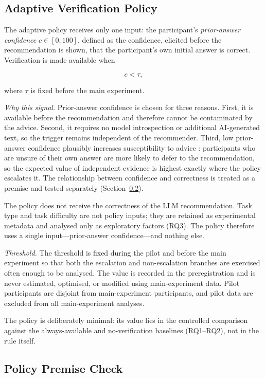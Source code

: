 \documentclass[oneside,final,14pt,a4paper]{extreport}
\begin{document}
\subsection{Adaptive Verification Policy}
\label{subsec:policy}

The adaptive policy receives only one input: the participant's
\emph{prior-answer confidence} $c\in[0,100]$, defined as the confidence,
elicited before the recommendation is shown, that the participant's own
initial answer is correct. Verification is made available when

\[
c < \tau,
\]

where $\tau$ is fixed before the main experiment.

\emph{Why this signal.} Prior-answer confidence is chosen for three reasons.
First, it is available before the recommendation and therefore cannot be
contaminated by the advice. Second, it requires no model introspection or
additional AI-generated text, so the trigger remains independent of the
recommender. Third, low prior-answer confidence plausibly increases
susceptibility to advice \cite{YanivKleinberger2000}: participants who are unsure of their
own answer are more likely to defer to the recommendation, so the expected
value of independent evidence is highest exactly where the policy escalates
it. The relationship between confidence and correctness is treated as a
premise and tested separately (Section~\ref{subsec:premise}).

The policy does not receive the correctness of the LLM recommendation. Task
type and task difficulty are not policy inputs; they are retained as
experimental metadata and analysed only as exploratory factors (RQ3). The
policy therefore uses a single input---prior-answer confidence---and nothing
else.

\emph{Threshold.} The threshold is fixed during the pilot and before the main
experiment so that both the escalation and non-escalation branches are
exercised often enough to be analysed. The value is recorded in the
preregistration and is never estimated, optimised, or modified using
main-experiment data. Pilot participants are disjoint from main-experiment
participants, and pilot data are excluded from all main-experiment analyses.

The policy is deliberately minimal: its value lies in the controlled comparison
against the always-available and no-verification baselines (RQ1--RQ2), not in
the rule itself.

\subsection{Policy Premise Check}
\label{subsec:premise}
\end{document}
